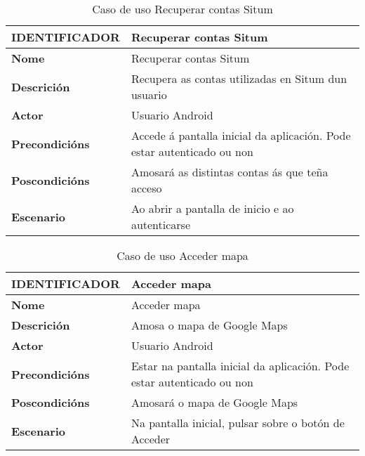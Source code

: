 \begin{table} [tbp]
	\begin{tabular}{|l|p{10cm}|}
		\hline 
		\textbf{IDENTIFICADOR}	& \textbf{Recuperar contas Situm} \\ 
		\hline 
		\textbf{Nome} & Recuperar contas Situm \\ 
		\hline 
		\textbf{Descrición} & Recupera as contas utilizadas en Situm dun usuario \\ 
		\hline 
		\textbf{Actor} & Usuario Android \\ 
		\hline 
		\textbf{Precondicións} & Accede á pantalla inicial da aplicación. Pode estar autenticado ou non \\ 
		\hline 
		\textbf{Poscondicións} & Amosará as distintas contas ás que teña acceso \\ 
		\hline 
		\textbf{Escenario} & Ao abrir a pantalla de inicio e ao autenticarse \\ 
		\hline 
	\end{tabular}
	\caption{Caso de uso Recuperar contas Situm}
	\label{tab:cuRecuperarContasSitum}
\end{table}

\begin{table} [tbp]
	\begin{tabular}{|l|p{10cm}|}
		\hline 
		\textbf{IDENTIFICADOR}	& \textbf{Acceder mapa} \\ 
		\hline 
		\textbf{Nome} & Acceder mapa \\ 
		\hline 
		\textbf{Descrición} & Amosa o mapa de Google Maps \\ 
		\hline 
		\textbf{Actor} & Usuario Android \\ 
		\hline 
		\textbf{Precondicións} & Estar na pantalla inicial da aplicación. Pode estar autenticado ou non \\ 
		\hline 
		\textbf{Poscondicións} & Amosará o mapa de Google Maps \\ 
		\hline 
		\textbf{Escenario} & Na pantalla inicial, pulsar sobre o botón de Acceder \\ 
		\hline 
	\end{tabular}
	\caption{Caso de uso Acceder mapa}
	\label{tab:cuAccederMapa}
\end{table}

